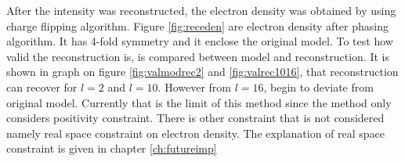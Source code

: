After the intensity was reconstructed, the electron density was obtained by using charge flipping algorithm. Figure \ref{fig:receden} are electron density  after phasing algorithm. It has 4-fold symmetry and it enclose the original model. To test how valid the reconstruction is, \Blq is compared between model and reconstruction. It is shown in graph on figure \ref{fig:valmodrec2} and \ref{fig:valrec1016}, that reconstruction can recover \Blq for $l=2$ and $l=10$. However from $l=16$, \Blq begin to deviate from original model. Currently that is the limit of this method since the method only considers positivity constraint. There is other constraint that is not considered namely real space constraint on electron density. The explanation of real space constraint is given in chapter \ref{ch:futureimp}  



